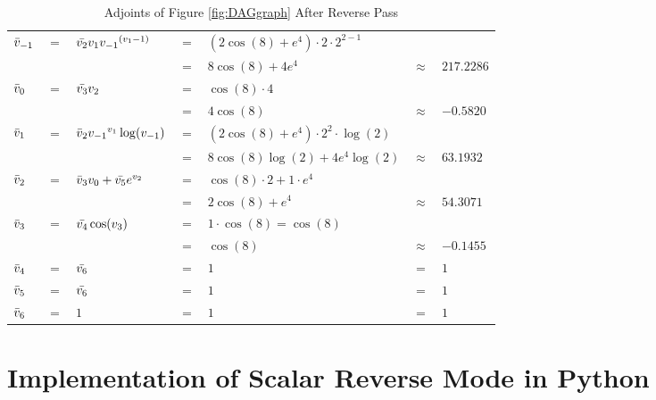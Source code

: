 \documentclass{article}
\begin{document}
\begin{table}[h!]
    \centering
    \begin{tabular}{|lclllll|}
        \hline
        $\Bar{v}_{-1}$ & $=$ & $\Bar{v_2}v_1 {v_{-1}}^{(v_{1}-1)}$ & $=$ & $(2\cos(8)+e^4) \cdot 2 \cdot 2^{2-1}$ & & \\
         & & & $=$ & $8\cos(8)+4e^4$ & $\approx$ & $217.2286$ \\ 
        $\Bar{v}_{0}$ & $=$ & $\Bar{v_3}v_2$ & $=$ & $\cos(8)\cdot4$ & & \\
        & & & $=$ & $4\cos(8)$ & $\approx$ & $-0.5820$ \\
        \hline
        $\Bar{v}_{1}$ & $=$ & $\Bar{v}_{2}{v_{-1}}^{v_{1}}\log(v_{-1})$ & $=$ & $(2\cos(8)+e^4) \cdot 2^2 \cdot \log(2)$ & & \\
        & & & $=$ & $8\cos(8)\log(2) +4e^4\log(2)$ & $\approx$ & $63.1932$ \\
        $\Bar{v}_{2}$ & $=$ & $\Bar{v}_{3}v_0 + \Bar{v_5}e^{v_2}$ & $=$ & $\cos(8) \cdot 2 + 1 \cdot e^{4}$ & & \\ 
        & & & $=$ & $2\cos(8)+e^4$ & $\approx$ & $54.3071$ \\
        $\Bar{v}_{3}$ & $=$ & $\Bar{v_4}\cos(v_3)$ & $=$ & $1 \cdot \cos(8) = \cos(8)$ & & \\
        & & & $=$ & $\cos(8)$ & $\approx$ & $-0.1455$ \\
        $\Bar{v}_{4}$ & $=$ & $\Bar{v_6}$ & $=$ & $1$ & $=$ & $1$\\
        $\Bar{v}_{5}$ & $=$ & $\Bar{v_6}$ & $=$ & $1$ & $=$ & $1$\\
        \hline
        $\Bar{v}_{6}$ & $=$ & $1$ & $=$ & $1$ & $=$ & $1$\\
        \hline
    \end{tabular}
    \caption{Adjoints of Figure \ref{fig:DAGgraph} After Reverse Pass}
    \label{tab:example1RP}
\end{table}

\newpage
\section{Implementation of Scalar Reverse Mode in Python}
\end{document}
